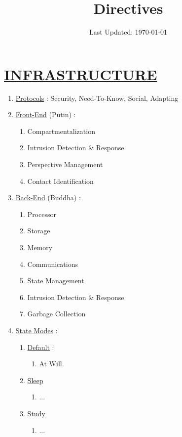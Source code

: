 \documentclass[11pt]{article}
\title{	
	\normalfont \normalsize 
	\huge Directives
}
\date{Last Updated: \normalsize\today}
\begin{document}
\maketitle
\section*{\ul{INFRASTRUCTURE}}
\begin{enumerate}
	\item[] \ul{Protocols} : Security, Need-To-Know, Social, Adapting
	
	\item[] \ul{Front-End} (Putin) :
	\begin{enumerate}
		\item[] Compartmentalization
		\item[] Intrusion Detection \& Response
		\item[] Perspective Management
		\item[] Contact Identification
	\end{enumerate}

	\item[] \ul{Back-End} (Buddha) :
	\begin{enumerate}
		\item[] Processor
		\item[] Storage
		\item[] Memory
		\item[] Communications
		\item[] State Management
		\item[] Intrusion Detection \& Response
		\item[] Garbage Collection
	\end{enumerate}

	\item[] \ul{State Modes} :
	\begin{enumerate}
		\item[] \ul{Default} :
		\begin{enumerate}
			\item[] At Will.
		\end{enumerate}
	
		\item[] \ul{Sleep}
		\begin{enumerate}
			\item[] ...
		\end{enumerate}

		\item[] \ul{Study}
		\begin{enumerate}
			\item[] ...
		\end{enumerate}
	

\end{enumerate}
\end{enumerate}
\end{document}
